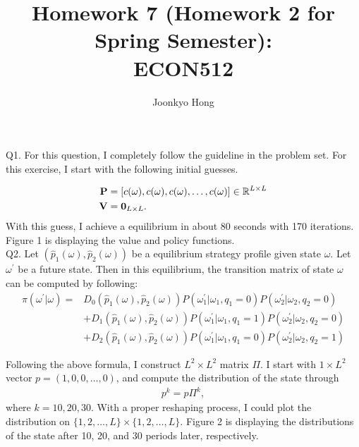 \documentclass[10pt, letterpaper]{article}
\begin{document}
\title{Homework 7 (Homework 2 for Spring Semester):\\ ECON512}
\author{Joonkyo Hong}
\date{}
\maketitle
\smallskip

\noindent Q1. For this question, I completely follow the guideline in the problem set. For this exercise, I start with the following initial guesses.

\begin{align*}
   \bold{P} & = [ c(\omega) , c(\omega) , c(\omega)  , \hdots , c(\omega)] \in \mathbb{R}^{L \times L} \\
   \bold{V} & = \bold{0}_{L \times L}.
\end{align*}
With this guess, I achieve a equilibrium in about 80 seconds with 170 iterations. Figure 1 is displaying the value and policy functions.\\

\noindent Q2. Let $( \hat{p}_{1}(\omega), \hat{p}_{2}(\omega) )$ be a equilibrium strategy profile given state $\omega$. Let $\omega^{'}$ be a future state. Then in this equilibrium, the transition matrix of state $\omega$ can be computed by following:
\begin{align*}
 \pi(\omega^{'}|\omega) = & D_{0}(\hat{p}_{1}(\omega), \hat{p}_{2}(\omega)) P(\omega_{1}^{'}|\omega_{1},q_{1}=0) P(\omega_{2}^{'}|\omega_{2},q_{2}=0)  \\
                          & + D_{1}(\hat{p}_{1}(\omega), \hat{p}_{2}(\omega)) P(\omega_{1}^{'}|\omega_{1},q_{1}=1) P(\omega_{2}^{'}|\omega_{2},q_{2}=0) \\
                          & + D_{2}(\hat{p}_{1}(\omega), \hat{p}_{2}(\omega)) P(\omega_{1}^{'}|\omega_{1},q_{1}=0) P(\omega_{2}^{'}|\omega_{2},q_{2}=1) 
\end{align*}

Following the above formula, I construct $L^{2} \times L^{2}$ matrix $\Pi$. I start with $1 \times L^{2}$ vector $p=(1,0,0, \hdots, 0)$, and compute the distribution of the state through
\begin{align*}
    p^{k} = p\Pi^{k},
\end{align*}
where $k=10,20,30$. With a proper reshaping process, I could plot the distribution on $\{1,2,\hdots,L \} \times \{1,2,\hdots,L\}$. Figure 2 is displaying the distributions of the state after 10, 20, and 30 periods later, respectively. \\
\end{document}
